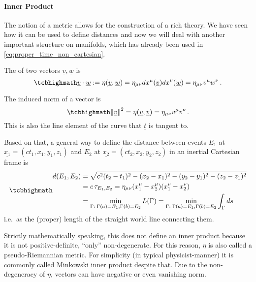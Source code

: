 		\paragraph{Inner Product}
The notion of a metric allows for the construction of a rich theory. We have seen how it can be used to define distances and now we will deal with another important structure on manifolds, which has already been used in \eqref{eq:proper_time_non_cartesian}.

\begin{defi}
The  of two vectors $\underline{v}, \underline{w}$ is
\begin{equation}\label{eq:inner_prod}
	\eqbox{
	\underline{v} \cdot \underline{w} := \eta(\underline{v}, \underline{w}) = \eta_{\mu \nu} dx^\mu(\underline{v}) dx^\nu(\underline{w}) = \eta_{\mu \nu} v^\mu w^\nu
	} \, .
\end{equation}

The induced norm of a vector is
\begin{equation}\label{eq:vector_norm}
	\eqbox{
	\norm{\underline{v}}^2 = \eta(\underline{v}, \underline{v}) = \eta_{\mu \nu} v^\mu v^\nu
	} \, .
\end{equation}
This is also the line element of the curve that $\underline{t}$ is tangent to.


Based on that, a general way to define the distance between events $E_1$ at $\underline{x_1} = (ct_1, x_1, y_1, z_1)$ and $E_2$ at $\underline{x_2} = (ct_2, x_2, y_2, z_2)$ in an inertial Cartesian frame is
\begin{equation}
	\eqbox{
	\begin{split}
	d(E_1, E_2) &= \sqrt{c^2 (t_2 - t_1)^2 - (x_2 - x_1)^2 - (y_2 - y_1)^2 - (z_2 - z_1)^2}
	\\
	&= c \, \tau_{E_1, E_2} = \eta_{\mu \nu} (x_1^\mu - x_2^\mu) (x_1^\nu - x_2^\nu)
	\\
	&= \min_{\Gamma: \; \Gamma(a) = E_1, \Gamma(b) = E_2} L(\Gamma)
	= \min_{\Gamma: \; \Gamma(a) = E_1, \Gamma(b) = E_2} \int_\Gamma ds
	\end{split}
	}
\end{equation}
i.e.~as the (proper) length of the straight world line connecting them.
\end{defi}
Strictly mathematically speaking, this does not define an inner product because it is not positive-definite, \enquote{only} non-degenerate. For this reason, $\eta$ is also called a pseudo-Riemannian metric. For simplicity (in typical physicist-manner) it is commonly called Minkowski inner product despite that. Due to the non-degeneracy of $\eta$, vectors can have negative or even vanishing norm.


